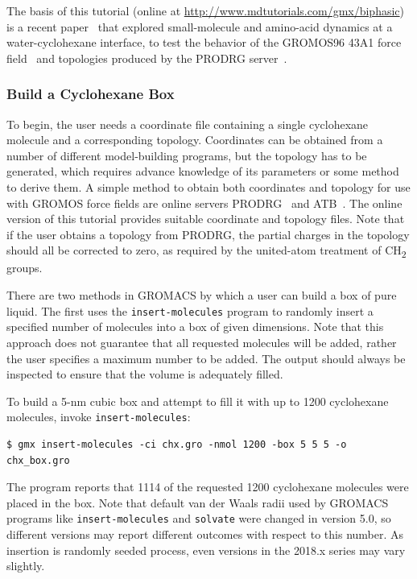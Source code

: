 \documentclass[9pt,tutorial,pubversion]{livecoms}
\newcommand{\urlstring}{http://www.mdtutorials.com/gmx}
\newcommand{\tutorialbiphasic}{\url{\urlstring/biphasic}}
\begin{document}
The basis of this tutorial (online at \tutorialbiphasic) is a recent paper~\cite{Lemkul2010b} that explored small-molecule and amino-acid dynamics at a water-cyclohexane interface, to test the behavior of the GROMOS96 43A1 force field~\cite{Daura1998,Schuler2001} and topologies produced by the PRODRG server~\cite{vanAalten1996}.

\subsubsection{Build a Cyclohexane Box} \label{biphasic_chx_box}

To begin, the user needs a coordinate file containing a single cyclohexane molecule and a corresponding topology. Coordinates can be obtained from a number of different model-building programs, but the topology has to be generated, which requires advance knowledge of its parameters or some method to derive them. A simple method to obtain both coordinates and topology for use with GROMOS force fields are online servers PRODRG~\cite{vanAalten1996} and ATB~\cite{Malde2011}. The online version of this tutorial provides suitable coordinate and topology files. Note that if the user obtains a topology from PRODRG, the partial charges in the topology should all be corrected to zero, as required by the united-atom treatment of CH\textsubscript{2} groups.

There are two methods in GROMACS by which a user can build a box of pure liquid. The first uses the \texttt{insert-molecules} program to randomly insert a specified number of molecules into a box of given dimensions. Note that this approach does not guarantee that all requested molecules will be added, rather the user specifies a maximum number to be added. The output should always be inspected to ensure that the volume is adequately filled.

To build a 5-nm cubic box and attempt to fill it with up to 1200 cyclohexane molecules, invoke \texttt{insert-molecules}:

\begin{lstlisting}
$ gmx insert-molecules -ci chx.gro -nmol 1200 -box 5 5 5 -o chx_box.gro
\end{lstlisting}

The program reports that 1114 of the requested 1200 cyclohexane molecules were placed in the box. Note that default van der Waals radii used by GROMACS programs like \texttt{insert-molecules} and \texttt{solvate} were changed in version 5.0, so different versions may report different outcomes with respect to this number. As insertion is randomly seeded process, even versions in the 2018.x series may vary slightly.
\end{document}
